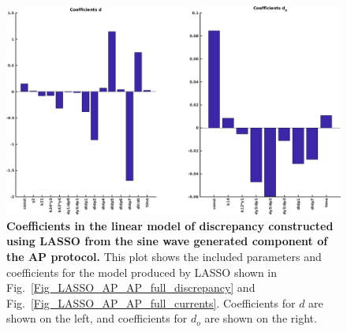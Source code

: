\documentclass[11pt,a4paper,oneside]{article}
\begin{document}
\clearpage

\begin{figure}[t]
\begin{center}
\includegraphics[scale=0.42]{Figures/LASSO_AP_AP_full_coefficients.png}
\caption{\textbf{Coefficients in the linear model of discrepancy constructed using LASSO from the sine wave generated component of the AP protocol.} This plot shows the included parameters and coefficients for the model produced by LASSO shown in Fig.~\ref{Fig_LASSO_AP_AP_full_discrepancy} and Fig.~\ref{Fig_LASSO_AP_AP_full_currents}. Coefficients for $d$ are shown on the left, and coefficients for $d_o$ are shown on the right.} 
\label{Fig_LASSO_AP_AP_full_coefficients}
\end{center}
\end{figure}
\end{document}
